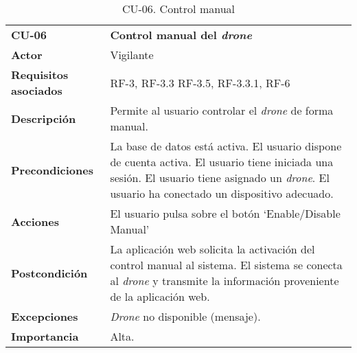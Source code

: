 \begin{table}
	\begin{center}
		\begin{tabular}{m{3cm}  m{10cm}}\hline
			\toprule
			\textbf{CU-06} & \textbf{Control manual del \emph{drone}}\\
			\otoprule
			\textbf{Actor} & Vigilante\\
			\textbf{Requisitos asociados} & RF-3, RF-3.3 RF-3.5, RF-3.3.1, RF-6\\
			\textbf{Descripción} & Permite al usuario controlar el \emph{drone} de forma manual.\\
			\textbf{Precondiciones} & La base de datos está activa. El usuario dispone de cuenta activa. El usuario tiene iniciada una sesión. El usuario tiene asignado un \emph{drone}. El usuario ha conectado un dispositivo adecuado.\\
			\textbf{Acciones} & El usuario pulsa sobre el botón `Enable/Disable Manual'\\
											
			\textbf{Postcondición} & La aplicación web solicita la activación del control manual al sistema. El sistema se conecta al \emph{drone} y transmite la información proveniente de la aplicación web.\\
			\textbf{Excepciones} & \emph{Drone} no disponible (mensaje).\\
			\textbf{Importancia} & Alta.\\
			\hline
			\bottomrule
		\end{tabular}
		\caption{CU-06. Control manual}
		\label{tb:CU06}
	\end{center}
\end{table}

